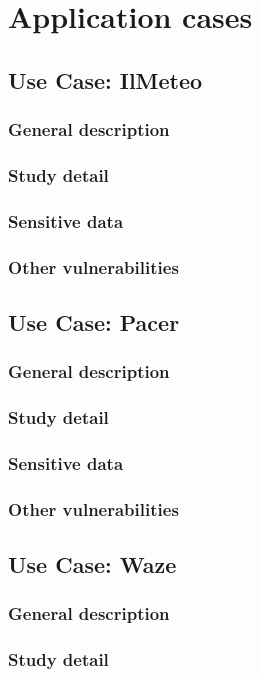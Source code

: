 \chapter{Application cases}
	\section{Use Case: IlMeteo}
		\subsection{General description}
		\subsection{Study detail}
		\subsection{Sensitive data}
		\subsection{Other vulnerabilities}

	\section{Use Case: Pacer}
		\subsection{General description}
		\subsection{Study detail}
		\subsection{Sensitive data}
		\subsection{Other vulnerabilities}

	\section{Use Case: Waze}
		\subsection{General description}
		\subsection{Study detail}
